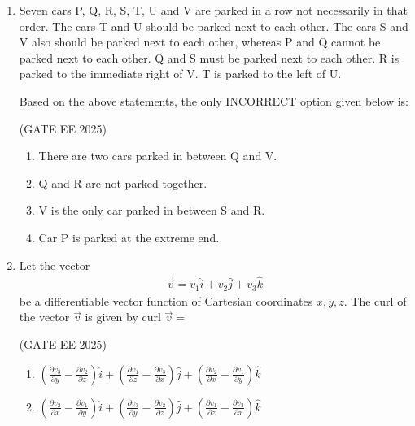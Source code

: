 \documentclass[journal,12pt,onecolumn]{IEEEtran}
\theoremstyle{remark}
\begin{document}
\begin{enumerate}
\begin{multicols}{4}
\begin{enumerate}
\item 65 and 53
\item 60 and 50
\item 55 and 53
\item 55 and 48
\end{enumerate}
\end{multicols}

\item Seven cars P, Q, R, S, T, U and V are parked in a row not necessarily in that order.  
The cars T and U should be parked next to each other. The cars S and V also should be parked next to each other, whereas P and Q cannot be parked next to each other. Q and S must be parked next to each other.  
R is parked to the immediate right of V. T is parked to the left of U.  

Based on the above statements, the only INCORRECT option given below is:

\hfill(GATE EE 2025)

\begin{enumerate}
\item There are two cars parked in between Q and V.
\item Q and R are not parked together.
\item V is the only car parked in between S and R.
\item Car P is parked at the extreme end.
\end{enumerate}

\item Let the vector \begin{align*}
  \vec{v}=v_{1} \hat{i}+v_{2}\hat{j}+v_{3}\hat{k}   
\end{align*}be a differentiable
vector function of Cartesian coordinates $x, y, z$.  
The curl of the vector $\vec{v}$ is given by curl $\vec{v} =$ 

\hfill(GATE EE 2025)

\begin{multicols}{2}
\begin{enumerate}
\item $\left(\frac{\partial v_{3}}{\partial y} - \frac{\partial v_{2}}{\partial z}\right)\hat{i}
+ \left(\frac{\partial v_{1}}{\partial z} - \frac{\partial v_{3}}{\partial x}\right)\hat{j}
+ \left(\frac{\partial v_{2}}{\partial x} - \frac{\partial v_{1}}{\partial y}\right)\hat{k}$

\item $\left(\frac{\partial v_{2}}{\partial x} - \frac{\partial v_{1}}{\partial y}\right)\hat{i}
+ \left(\frac{\partial v_{3}}{\partial y} - \frac{\partial v_{2}}{\partial z}\right)\hat{j}
+ \left(\frac{\partial v_{1}}{\partial z} - \frac{\partial v_{3}}{\partial x}\right)\hat{k}$


\end{enumerate}
\end{multicols}
\end{enumerate}
\end{document}
